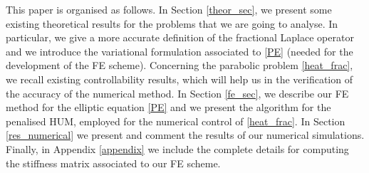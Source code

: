 This paper is organised as follows. In Section \ref{theor_sec}, we present some existing theoretical results for the problems that we are going to analyse. In particular, we give a more accurate definition of the fractional Laplace operator and we introduce the variational formulation associated to \eqref{PE} (needed for the development of the FE scheme). Concerning the parabolic problem \eqref{heat_frac}, we recall existing controllability results, which will help us in the verification of the accuracy of the numerical method. In Section \ref{fe_sec}, we describe our FE method for the elliptic equation \eqref{PE} and we present the algorithm for the penalised HUM, employed for the numerical control of \eqref{heat_frac}. In Section \ref{res_numerical} we present and comment the results of our numerical simulations. Finally, in Appendix \ref{appendix} we include the complete details for computing the stiffness matrix associated to our FE scheme.  

